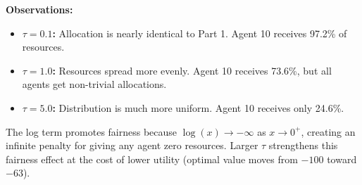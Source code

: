 \documentclass[11pt]{article}
\begin{document}
\textbf{Observations:}

\begin{itemize}
    \item \textbf{$\tau = 0.1$:} Allocation is nearly identical to Part 1. Agent 10 receives 97.2\% of resources.
    
    \item \textbf{$\tau = 1.0$:} Resources spread more evenly. Agent 10 receives 73.6\%, but all agents get non-trivial allocations.
    
    \item \textbf{$\tau = 5.0$:} Distribution is much more uniform. Agent 10 receives only 24.6\%.
\end{itemize}

The log term promotes fairness because $\log(x) \to -\infty$ as $x \to 0^+$, creating an infinite penalty for giving any agent zero resources. Larger $\tau$ strengthens this fairness effect at the cost of lower utility (optimal value moves from $-100$ toward $-63$).
\end{document}
